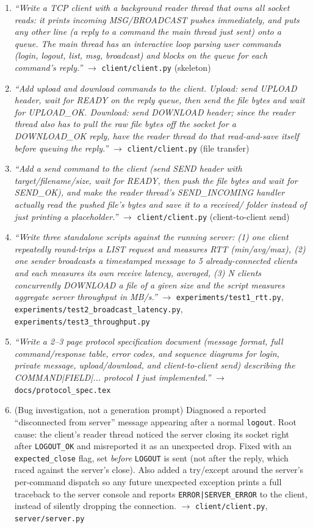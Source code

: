 \documentclass[11pt]{article}
\newcommand{\cmd}[1]{\texttt{#1}}
\begin{document}
\begin{enumerate}[leftmargin=1.7em]
\item \textit{``Write a TCP client with a background reader thread
that owns all socket reads: it prints incoming MSG/BROADCAST pushes
immediately, and puts any other line (a reply to a command the main
thread just sent) onto a queue. The main thread has an interactive
loop parsing user commands (login, logout, list, msg, broadcast) and
blocks on the queue for each command's reply.''} $\to$
\cmd{client/client.py} (skeleton)

\item \textit{``Add upload and download commands to the client.
Upload: send UPLOAD header, wait for READY on the reply queue, then
send the file bytes and wait for UPLOAD\_OK. Download: send DOWNLOAD
header; since the reader thread also has to pull the raw file bytes
off the socket for a DOWNLOAD\_OK reply, have the reader thread do
that read-and-save itself before queuing the reply.''} $\to$
\cmd{client/client.py} (file transfer)

\item \textit{``Add a send command to the client (send SEND header
with target/filename/size, wait for READY, then push the file bytes
and wait for SEND\_OK), and make the reader thread's SEND\_INCOMING
handler actually read the pushed file's bytes and save it to a
received/ folder instead of just printing a placeholder.''} $\to$
\cmd{client/client.py} (client-to-client send)

\item \textit{``Write three standalone scripts against the running
server: (1) one client repeatedly round-trips a LIST request and
measures RTT (min/avg/max), (2) one sender broadcasts a timestamped
message to 5 already-connected clients and each measures its own
receive latency, averaged, (3) N clients concurrently DOWNLOAD a file
of a given size and the script measures aggregate server throughput in
MB/s.''} $\to$ \cmd{experiments/test1\_rtt.py},
\cmd{experiments/test2\_broadcast\_latency.py},
\cmd{experiments/test3\_throughput.py}

\item \textit{``Write a 2--3 page protocol specification document
(message format, full command/response table, error codes, and
sequence diagrams for login, private message, upload/download, and
client-to-client send) describing the COMMAND|FIELD|... protocol I
just implemented.''} $\to$ \cmd{docs/protocol\_spec.tex}

\item (Bug investigation, not a generation prompt) Diagnosed a reported
``disconnected from server'' message appearing after a normal
\cmd{logout}. Root cause: the client's reader thread noticed the
server closing its socket right after \cmd{LOGOUT\_OK} and
misreported it as an unexpected drop. Fixed with an
\cmd{expected\_close} flag, set \textit{before} \cmd{LOGOUT} is sent
(not after the reply, which raced against the server's close). Also
added a try/except around the server's per-command dispatch so any
future unexpected exception prints a full traceback to the server
console and reports \cmd{ERROR|SERVER\_ERROR} to the client, instead
of silently dropping the connection. $\to$ \cmd{client/client.py},
\cmd{server/server.py}


\end{enumerate}
\end{document}
